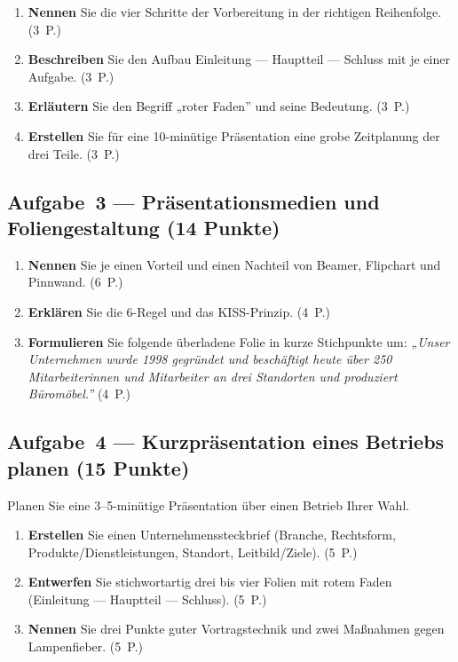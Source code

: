 \documentclass[11pt, a4paper]{article}
\begin{document}
\medskip
\begin{enumerate}[label=(\alph*)]
  \item \textbf{Nennen} Sie die vier Schritte der Vorbereitung in der richtigen Reihenfolge. \hfill (3~P.)
  \item \textbf{Beschreiben} Sie den Aufbau Einleitung --- Hauptteil --- Schluss mit je einer Aufgabe. \hfill (3~P.)
  \item \textbf{Erläutern} Sie den Begriff „roter Faden” und seine Bedeutung. \hfill (3~P.)
  \item \textbf{Erstellen} Sie für eine 10-minütige Präsentation eine grobe Zeitplanung der drei Teile. \hfill (3~P.)
\end{enumerate}

\subsection*{Aufgabe~3 --- Präsentationsmedien und Foliengestaltung (14 Punkte)}

\medskip
\begin{enumerate}[label=(\alph*)]
  \item \textbf{Nennen} Sie je einen Vorteil und einen Nachteil von Beamer, Flipchart und Pinnwand. \hfill (6~P.)
  \item \textbf{Erklären} Sie die 6-Regel und das KISS-Prinzip. \hfill (4~P.)
  \item \textbf{Formulieren} Sie folgende überladene Folie in kurze Stichpunkte um: \emph{„Unser Unternehmen wurde 1998 gegründet und beschäftigt heute über 250 Mitarbeiterinnen und Mitarbeiter an drei Standorten und produziert Büromöbel.”} \hfill (4~P.)
\end{enumerate}

\subsection*{Aufgabe~4 --- Kurzpräsentation eines Betriebs planen (15 Punkte)}

\medskip
Planen Sie eine 3--5-minütige Präsentation über einen Betrieb Ihrer Wahl.

\begin{enumerate}[label=(\alph*)]
  \item \textbf{Erstellen} Sie einen Unternehmenssteckbrief (Branche, Rechtsform, Produkte/Dienstleistungen, Standort, Leitbild/Ziele). \hfill (5~P.)
  \item \textbf{Entwerfen} Sie stichwortartig drei bis vier Folien mit rotem Faden (Einleitung --- Hauptteil --- Schluss). \hfill (5~P.)
  \item \textbf{Nennen} Sie drei Punkte guter Vortragstechnik und zwei Maßnahmen gegen Lampenfieber. \hfill (5~P.)
\end{enumerate}
\end{document}
